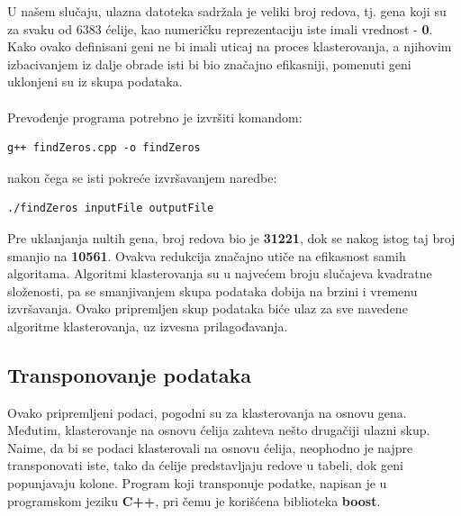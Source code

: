 \documentclass[a4paper]{article}
\begin{document}
U našem slučaju, ulazna datoteka sadržala je veliki broj redova, tj. gena koji su za svaku od 6383 ćelije, kao numeričku reprezentaciju iste imali vrednost - \textbf{0}. Kako ovako definisani geni ne bi imali uticaj na proces klasterovanja, a njihovim izbacivanjem iz dalje obrade isti bi bio značajno efikasniji, pomenuti geni uklonjeni su iz skupa podataka.
\\
 \\

Prevođenje programa potrebno je izvršiti komandom:
\begin{tcolorbox}
\begin{verbatim}
g++ findZeros.cpp -o findZeros 
\end{verbatim}
\end{tcolorbox}

nakon čega se isti pokreće izvršavanjem naredbe:

\begin{tcolorbox}
\begin{verbatim}
./findZeros inputFile outputFile
\end{verbatim}
\end{tcolorbox}

 
 
Pre uklanjanja nultih gena, broj redova bio je \textbf{31221}, dok se nakog istog taj broj smanjio na \textbf{10561}. Ovakva redukcija značajno utiče na efikasnost samih algoritama. Algoritmi klasterovanja su u najvećem broju slučajeva kvadratne složenosti, pa se smanjivanjem skupa podataka dobija na brzini i vremenu izvršavanja. Ovako pripremljen skup podataka biće ulaz za sve navedene algoritme klasterovanja, uz izvesna prilagođavanja.

 
\subsection{Transponovanje podataka}
Ovako pripremljeni podaci, pogodni su za klasterovanja na osnovu gena. Međutim, klasterovanje na osnovu ćelija zahteva nešto drugačiji ulazni skup. Naime, da bi se podaci klasterovali na osnovu ćelija, neophodno je najpre transponovati iste, tako da ćelije predstavljaju redove u tabeli, dok geni popunjavaju kolone.
Program koji transponuje podatke, napisan je u programskom jeziku \textbf{C++}, pri čemu je korišćena biblioteka \textbf{boost}.
\end{document}
